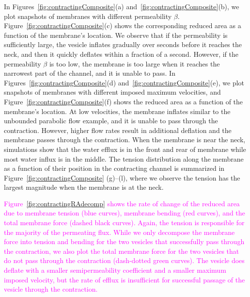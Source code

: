 \documentclass[prb,preprint,showpacs,preprintnumbers,amsmath,amssymb,longbibliography]{revtex4-1}
\begin{document}
In Figures~\ref{fig:contractingComposite}(a)
and~\ref{fig:contractingComposite}(b), we plot snapshots of membranes
with different permeability $\beta$.
Figure~\ref{fig:contractingComposite}(c) shows the corresponding reduced
area as a function of the membrane's location. We observe that if the
permeability is sufficiently large, the vesicle inflates gradually over
seconds before it reaches the neck, and then it quickly deflates within
a fraction of a second. However, if the permeability $\beta$ is too
low, the membrane is too large when it reaches the narrowest part of the
channel, and it is unable to pass. In
Figures~\ref{fig:contractingComposite}(d)
and~\ref{fig:contractingComposite}(e), we plot snapshots of membranes
with different imposed maximum velocities, and
Figure~\ref{fig:contractingComposite}(f) shows the reduced area as a
function of the membrane's location. At low velocities, the membrane
inflates similar to the unbounded parabolic flow example, and it is
unable to pass through the contraction. However, higher flow rates
result in additional deflation and the membrane passes through the
contraction. When the membrane is near the neck, simulations show that
the water efflux is in the front and rear of membrane while most water
influx is in the middle. The tension distribution along the membrane as
a function of their position in the contracting channel is summarized in
Figure~\ref{fig:contractingComposite} (g)--(l), where we observe the
tension has the largest magnitude when the membrane is at the neck. 

\textcolor{magenta}{
Figure~\ref{fig:contractingRAdecomp} shows the rate of change of the
reduced area due to membrane tension (blue curves), membrane bending (red curves),
and the total membrane force (dashed black curves). Again, the tension is responsible
for the majority of the permeating flux. While we
only decompose the membrane force into tension and bending for the two
vesicles that successfully pass through the contraction, we also plot
the total membrane force for the two vesicles that do not pass through
the contraction (dash-dotted green curves). The vesicle does deflate with a smaller
semipermeability coefficient and a smaller maximum imposed velocity, but
the rate of efflux is insufficient for successful passage of the vesicle
through the contraction.}
\end{document}
